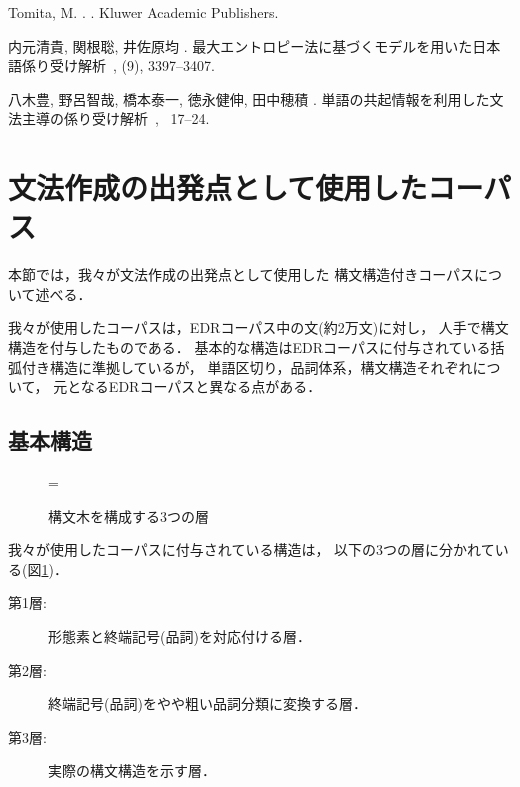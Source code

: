 \begin{thebibliography}{}
Tomita, M. \BBCP.
.
\newblock Kluwer Academic Publishers.

内元清貴, 関根聡, 井佐原均 \BBCP.
\newblock \JBOQ
  最大エントロピー法に基づくモデルを用いた日本語係り受け解析\JBCQ\
\newblock {}, {}  (9), 3397--3407.

八木豊, 野呂智哉, 橋本泰一, 徳永健伸, 田中穂積 \BBCP.
\newblock \JBOQ 単語の共起情報を利用した文法主導の係り受け解析\JBCQ\
\newblock {}, \BPGS\ 17--24.

\end{thebibliography}

\appendix

\section{文法作成の出発点として使用したコーパス}
\label{sec:Corpus}

本節では，我々が文法作成の出発点として使用した
構文構造付きコーパスについて述べる．

我々が使用したコーパスは，EDRコーパス中の文(約2万文)に対し，
人手で構文構造を付与したものである．
基本的な構造はEDRコーパスに付与されている括弧付き構造に準拠しているが，
単語区切り，品詞体系，構文構造それぞれについて，
元となるEDRコーパスと異なる点がある．

\subsection{基本構造}

\begin{figure}[tp]
  \centering
  \epsfxsize=\textwidth
  \caption{構文木を構成する3つの層}
  \label{fig:edrtree_pos}
\end{figure}

我々が使用したコーパスに付与されている構造は，
以下の3つの層に分かれている(図\ref{fig:edrtree_pos})．
\begin{description}
\item[第1層: ] 形態素と終端記号(品詞)を対応付ける層．
\item[第2層: ] 終端記号(品詞)をやや粗い品詞分類に変換する層．
\item[第3層: ] 実際の構文構造を示す層．
\end{description}

